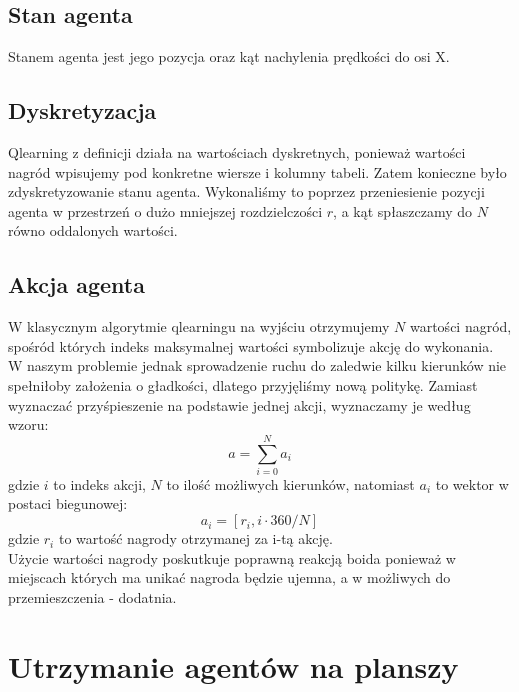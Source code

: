 \documentclass{article}
\begin{document}
\subsection{Stan agenta}
Stanem agenta jest jego pozycja oraz kąt nachylenia prędkości do osi X. 
\subsection{Dyskretyzacja}
Qlearning z definicji działa na wartościach dyskretnych, ponieważ wartości nagród wpisujemy pod konkretne wiersze i kolumny tabeli. Zatem konieczne było zdyskretyzowanie stanu agenta. Wykonaliśmy to poprzez przeniesienie pozycji agenta w przestrzeń o dużo mniejszej rozdzielczości \(r\), a kąt spłaszczamy do \(N\) równo oddalonych wartości.
\subsection{Akcja agenta}
W klasycznym algorytmie qlearningu na wyjściu otrzymujemy \(N\) wartości nagród, spośród których indeks maksymalnej wartości symbolizuje akcję do wykonania. W naszym problemie jednak sprowadzenie ruchu do zaledwie kilku kierunków nie spełniłoby założenia o gładkości, dlatego przyjęliśmy nową politykę. Zamiast wyznaczać przyśpieszenie na podstawie jednej akcji, wyznaczamy je według wzoru:
\begin{equation}
    a = \sum \limits_{i = 0}^{N}a_i
\end{equation}
gdzie \(i\) to indeks akcji, \(N\) to ilość możliwych kierunków, natomiast \(a_i\) to wektor w postaci biegunowej: 
\begin{equation}
    a_i = [r_i, i \cdot 360/N]
\end{equation}
gdzie \(r_i\) to wartość nagrody otrzymanej za i-tą akcję.\\
Użycie wartości nagrody poskutkuje poprawną reakcją boida ponieważ w miejscach których ma unikać nagroda będzie ujemna, a w możliwych do przemieszczenia - dodatnia.
\section{Utrzymanie agentów na planszy}
\end{document}

